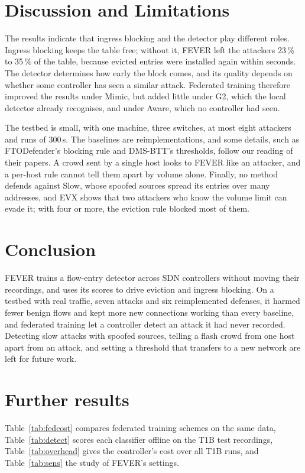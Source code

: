 \documentclass[conference]{IEEEtran}
\begin{document}
\section{Discussion and Limitations}
\label{sec:discussion}

The results indicate that ingress blocking and the detector play different roles. Ingress blocking keeps
the table free; without it, FEVER left the attackers 23\,\% to 35\,\% of the table, because evicted
entries were installed again within seconds. The detector determines how early the block comes, and its
quality depends on whether some controller has seen a similar attack. Federated training therefore
improved the results under Mimic, but added little under G2, which the local detector already
recognises, and under Aware, which no controller had seen.

The testbed is small, with one machine, three switches, at most eight attackers and runs of 300\,s. The
baselines are reimplementations, and some details, such as FTODefender's blocking rule and DMS-BTT's
thresholds, follow our reading of their papers. A crowd sent by a single host looks to FEVER like an
attacker, and a per-host rule cannot tell them apart by volume alone. Finally, no method defends against
Slow, whose spoofed sources spread its entries over many addresses, and EVX shows that two attackers who
know the volume limit can evade it; with four or more, the eviction rule blocked most of them.

\section{Conclusion}
\label{sec:conclusion}

FEVER trains a flow-entry detector across SDN controllers without moving their recordings, and uses its
scores to drive eviction and ingress blocking. On a testbed with real traffic, seven attacks and six reimplemented
defenses, it harmed fewer benign flows and kept more new connections working than every baseline, and
federated training let a controller detect an attack it had never recorded. Detecting slow attacks with
spoofed sources, telling a flash crowd from one host apart from an attack, and setting a threshold that
transfers to a new network are left for future work.




\appendices

\section{Further results}

Table~\ref{tab:fedcost} compares federated training schemes on the same data, Table~\ref{tab:detect}
scores each classifier offline on the T1B test recordings, Table~\ref{tab:overhead} gives the
controller's cost over all T1B runs, and Table~\ref{tab:sens} the study of FEVER's settings.



\begingroup\renewcommand{\small}{\footnotesize}\endgroup

\end{document}
